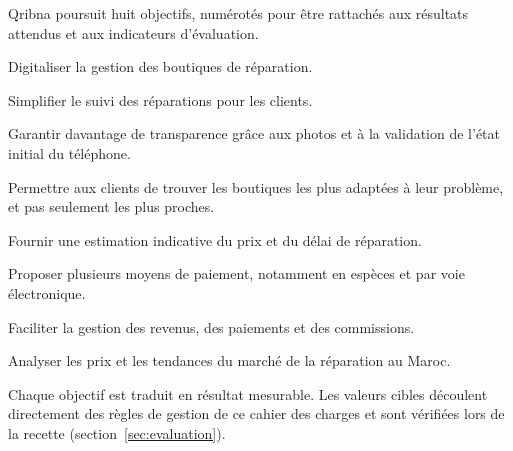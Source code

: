 

Qribna poursuit huit objectifs, numérotés pour être rattachés aux résultats attendus et aux indicateurs d’évaluation.

\begin{cdcdefinitions}[1.2cm]
  \item[O1] Digitaliser la gestion des boutiques de réparation.
  \item[O2] Simplifier le suivi des réparations pour les clients.
  \item[O3] Garantir davantage de transparence grâce aux photos et à la validation de l’état initial du téléphone.
  \item[O4] Permettre aux clients de trouver les boutiques les plus adaptées à leur problème, et pas seulement les plus proches.
  \item[O5] Fournir une estimation indicative du prix et du délai de réparation.
  \item[O6] Proposer plusieurs moyens de paiement, notamment en espèces et par voie électronique.
  \item[O7] Faciliter la gestion des revenus, des paiements et des commissions.
  \item[O8] Analyser les prix et les tendances du marché de la réparation au Maroc.
\end{cdcdefinitions}

\label{sec:resultats}

Chaque objectif est traduit en résultat mesurable. Les valeurs cibles découlent directement des règles de gestion de ce cahier des charges et sont vérifiées lors de la recette (section~\ref{sec:evaluation}).

